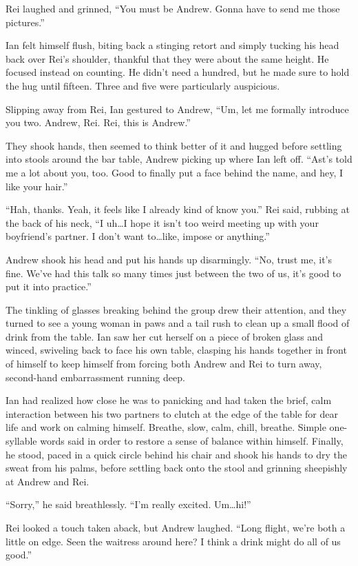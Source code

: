 Rei laughed and grinned, ``You must be Andrew. Gonna have to send me those pictures.''

Ian felt himself flush, biting back a stinging retort and simply tucking his head back over Rei's shoulder, thankful that they were about the same height. He focused instead on counting. He didn't need a hundred, but he made sure to hold the hug until fifteen. Three and five were particularly auspicious.

Slipping away from Rei, Ian gestured to Andrew, ``Um, let me formally introduce you two. Andrew, Rei. Rei, this is Andrew.''

They shook hands, then seemed to think better of it and hugged before settling into stools around the bar table, Andrew picking up where Ian left off. ``Ast's told me a lot about you, too. Good to finally put a face behind the name, and hey, I like your hair.''

``Hah, thanks. Yeah, it feels like I already kind of know you.'' Rei said, rubbing at the back of his neck, ``I uh\ldots{}I hope it isn't too weird meeting up with your boyfriend's partner. I don't want to\ldots{}like, impose or anything.''

Andrew shook his head and put his hands up disarmingly. ``No, trust me, it's fine. We've had this talk so many times just between the two of us, it's good to put it into practice.''

The tinkling of glasses breaking behind the group drew their attention, and they turned to see a young woman in paws and a tail rush to clean up a small flood of drink from the table. Ian saw her cut herself on a piece of broken glass and winced, swiveling back to face his own table, clasping his hands together in front of himself to keep himself from forcing both Andrew and Rei to turn away, second-hand embarrassment running deep.

Ian had realized how close he was to panicking and had taken the brief, calm interaction between his two partners to clutch at the edge of the table for dear life and work on calming himself. Breathe, slow, calm, chill, breathe. Simple one-syllable words said in order to restore a sense of balance within himself. Finally, he stood, paced in a quick circle behind his chair and shook his hands to dry the sweat from his palms, before settling back onto the stool and grinning sheepishly at Andrew and Rei.

``Sorry,'' he said breathlessly. ``I'm really excited. Um\ldots{}hi!''

Rei looked a touch taken aback, but Andrew laughed. ``Long flight, we're both a little on edge. Seen the waitress around here? I think a drink might do all of us good.''

